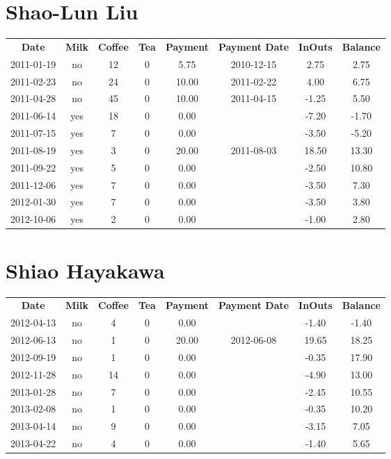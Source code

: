 \section{Shao-Lun Liu}

\begin{center}
\begin{tabular}{cccccccc}
\textbf{Date} & \textbf{Milk} & \textbf{Coffee} & \textbf{Tea} & \textbf{Payment} & \textbf{Payment Date} & \textbf{InOuts} & \textbf{Balance} \\
2011-01-19 & no & 12 & 0 &  5.75 & 2010-12-15 &  2.75 &  2.75\\ 
2011-02-23 & no & 24 & 0 & 10.00 & 2011-02-22 &  4.00 &  6.75\\ 
2011-04-28 & no & 45 & 0 & 10.00 & 2011-04-15 & -1.25 &  5.50\\ 
2011-06-14 & yes & 18 & 0 &  0.00 &  & -7.20 & -1.70\\ 
2011-07-15 & yes &  7 & 0 &  0.00 &  & -3.50 & -5.20\\ 
2011-08-19 & yes &  3 & 0 & 20.00 & 2011-08-03 & 18.50 & 13.30\\ 
2011-09-22 & yes &  5 & 0 &  0.00 &  & -2.50 & 10.80\\ 
2011-12-06 & yes &  7 & 0 &  0.00 &  & -3.50 &  7.30\\ 
2012-01-30 & yes &  7 & 0 &  0.00 &  & -3.50 &  3.80\\ 
2012-10-06 & yes &  2 & 0 &  0.00 &  & -1.00 &  2.80
\end{tabular}
\end{center}

\section{Shiao Hayakawa}

\begin{center}
\begin{tabular}{cccccccc}
\textbf{Date} & \textbf{Milk} & \textbf{Coffee} & \textbf{Tea} & \textbf{Payment} & \textbf{Payment Date} & \textbf{InOuts} & \textbf{Balance} \\
2012-04-13 & no &  4 & 0 &  0.00 &  & -1.40 & -1.40\\ 
2012-06-13 & no &  1 & 0 & 20.00 & 2012-06-08 & 19.65 & 18.25\\ 
2012-09-19 & no &  1 & 0 &  0.00 &  & -0.35 & 17.90\\ 
2012-11-28 & no & 14 & 0 &  0.00 &  & -4.90 & 13.00\\ 
2013-01-28 & no &  7 & 0 &  0.00 &  & -2.45 & 10.55\\ 
2013-02-08 & no &  1 & 0 &  0.00 &  & -0.35 & 10.20\\ 
2013-04-14 & no &  9 & 0 &  0.00 &  & -3.15 &  7.05\\ 
2013-04-22 & no &  4 & 0 &  0.00 &  & -1.40 &  5.65
\end{tabular}
\end{center}

